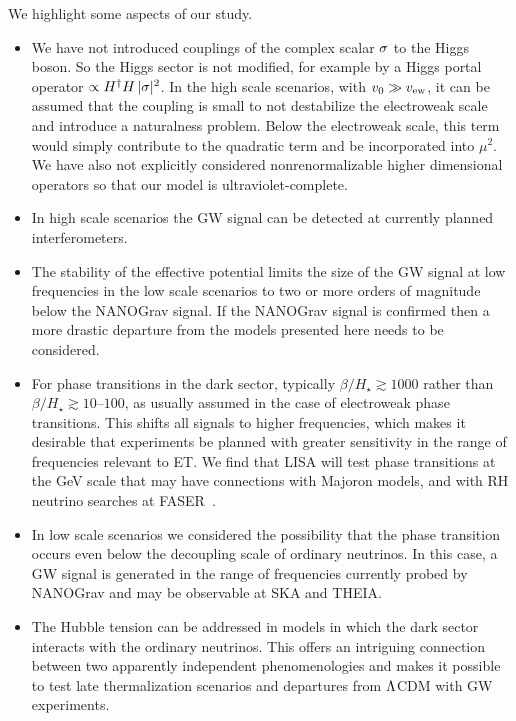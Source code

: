 \documentclass[a4paper,11pt]{article}
\begin{document}
We highlight some aspects of our study.
\begin{itemize}
\item We have not introduced couplings of the complex scalar $\sigma$
to the Higgs boson. So  the Higgs sector is not modified, for example by
a Higgs portal operator $\propto H^\dagger H \, |\sigma|^2$. In the high scale scenarios, with $v_0 \gg v_{\rm ew}$, it can be assumed
that the coupling is small  to not destabilize the electroweak scale and introduce a naturalness problem. 
Below the electroweak scale, this term would simply contribute to the quadratic term and be incorporated into $\mu^2$. We  have also not explicitly considered nonrenormalizable higher dimensional
operators so that our model is ultraviolet-complete. 
\item In high scale scenarios the GW signal can be detected at currently planned interferometers. 
\item The stability of the effective potential limits the size of the GW signal at low frequencies
in the low scale scenarios to two or more orders of magnitude below the NANOGrav signal. If the NANOGrav signal is confirmed
then a more drastic departure from the models presented here needs to be considered.
\item For phase transitions in the dark sector, typically $\beta/H_\star \gtrsim 1000$ rather than
$\beta/H_\star \gtrsim 10$--$100$, as usually assumed in the case of electroweak phase transitions. This shifts all signals to higher frequencies, which makes it desirable that experiments be planned with greater sensitivity in the range of frequencies relevant to ET. We find that LISA will 
test phase transitions at the GeV scale that may have connections with Majoron models, and with RH neutrino searches at FASER~\cite{Ariga:2019ufm}.
\item In low scale scenarios we considered the possibility that the phase transition occurs even below the decoupling scale of ordinary neutrinos. In this case, a GW signal is generated in the range of frequencies currently probed by NANOGrav and may be observable 
at SKA and THEIA. 
\item The Hubble tension can be addressed in models in which the dark sector interacts with the ordinary neutrinos. 
This offers an intriguing connection between two apparently independent phenomenologies and  makes it possible to test late thermalization scenarios and departures from $\Lambda$CDM with GW experiments.

\end{itemize}
\end{document}
